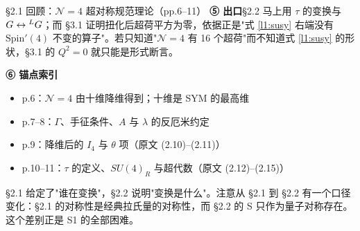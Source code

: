 \begin{kcard}{§2.1 回顾：$\mathcal N=4$ 超对称规范理论（pp.6--11）}
\noindent\textbf{⑤ 出口}\quad \S2.2 马上用 $\tau$ 的变换与 $G\leftrightarrow{}^{L}G$；而 \S3.1 证明扭化后超荷平方为零，依据正是"式 \eqref{l1:susy} 右端没有 $\mathrm{Spin}'(4)$ 不变的算子"。若只知道"$\mathcal N=4$ 有 16 个超荷"而不知道式 \eqref{l1:susy} 的形状，\S3.1 的 $Q^2=0$ 就只能是形式断言。\pB{}

\noindent\textbf{⑥ 锚点索引}\quad
\begin{itemize}
\item p.6：$\mathcal N=4$ 由十维降维得到；十维是 SYM 的最高维
\item p.7--8：$\Gamma$、手征条件、$A$ 与 $\lambda$ 的反厄米约定
\item p.9：降维后的 $I_4$ 与 $\theta$ 项（原文 (2.10)--(2.11)）
\item p.10--11：$\tau$ 的定义、$SU(4)_R$ 与超代数（原文 (2.12)--(2.15)）
\end{itemize}
\end{kcard}

\noindent{}

\noindent{}

\medskip
\S2.1 给定了"谁在变换"，\S2.2 说明"变换是什么"。注意从 \S2.1 到 \S2.2 有一个口径变化：\S2.1 的对称性是经典拉氏量的对称性，而 \S2.2 的 S 只作为量子对称存在。这个差别正是 S1 的全部困难。\pC

